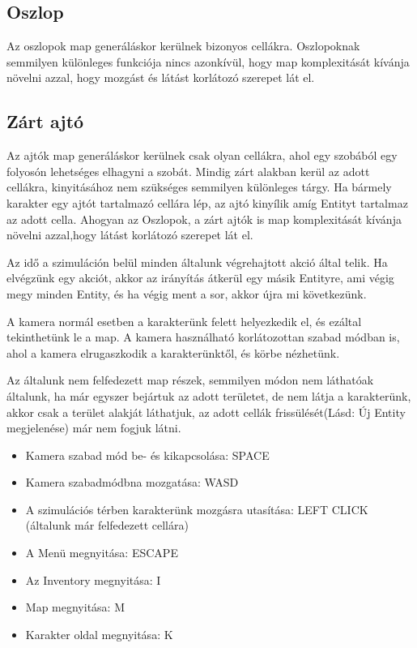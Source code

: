 \subsection{Oszlop}

Az oszlopok map generáláskor kerülnek bizonyos cellákra.
Oszlopoknak semmilyen különleges funkciója nincs azonkívül, hogy map komplexitását kívánja növelni azzal,
hogy mozgást és látást korlátozó szerepet lát el.

\subsection{Zárt ajtó}

Az ajtók map generáláskor kerülnek csak olyan cellákra, ahol egy szobából egy folyosón lehetséges elhagyni a szobát.
Mindig zárt alakban kerül az adott cellákra, kinyitásához nem szükséges semmilyen különleges tárgy. Ha bármely karakter egy ajtót tartalmazó cellára lép, az ajtó kinyílik amíg Entityt tartalmaz az adott cella.
Ahogyan az Oszlopok, a zárt ajtók is map komplexitását kívánja növelni azzal,hogy látást korlátozó szerepet lát el.


Az idő a szimuláción belül minden általunk végrehajtott akció által telik.
Ha elvégzünk egy akciót, akkor az irányítás átkerül egy másik Entityre,
ami végig megy minden Entity, és ha végig ment a sor, akkor újra mi következünk.


A kamera normál esetben a karakterünk felett helyezkedik el, és ezáltal tekinthetünk le a map.
A kamera használható korlátozottan szabad módban is, ahol a kamera elrugaszkodik a karakterünktől, és körbe nézhetünk.


Az általunk nem felfedezett map részek, semmilyen módon nem láthatóak általunk, ha már egyszer bejártuk az adott területet, 
de nem látja a karakterünk, akkor csak a terület alakját láthatjuk, az adott cellák frissülését(Lásd: Új Entity megjelenése) már nem fogjuk látni.


\begin{itemize}
    \item Kamera szabad mód be- és kikapcsolása: SPACE
    \item Kamera szabadmódbna mozgatása: WASD
    \item A szimulációs térben karakterünk mozgásra utasítása: LEFT CLICK (általunk már felfedezett cellára)
    \item A Menü megnyitása: ESCAPE
    \item Az Inventory megnyitása: I
    \item Map megnyitása: M
    \item Karakter oldal megnyitása: K
\end{itemize}

